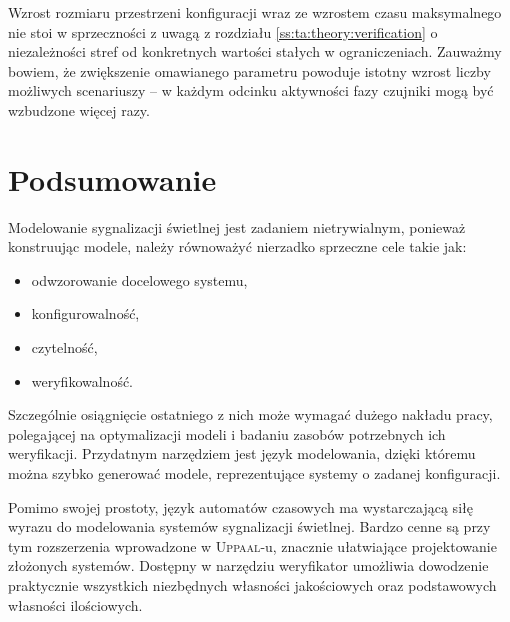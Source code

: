 \documentclass{pracamgr}
\newcommand{\upp}{\textsc{Uppaal}}
\theoremstyle{plain}
\begin{document}
Wzrost rozmiaru przestrzeni konfiguracji wraz ze wzrostem czasu
maksymalnego nie stoi w sprzeczności z uwagą z rozdziału
\ref{ss:ta:theory:verification} o niezależności stref od
konkretnych wartości stałych w ograniczeniach. Zauważmy bowiem, że
zwiększenie omawianego parametru powoduje istotny wzrost liczby
możliwych scenariuszy -- w każdym odcinku aktywności fazy czujniki
mogą być wzbudzone więcej razy.

\chapter*{Podsumowanie}
Modelowanie sygnalizacji świetlnej jest zadaniem nietrywialnym,
ponieważ konstruując modele, należy równoważyć nierzadko sprzeczne
cele takie jak:
\begin{itemize}
  \item odwzorowanie docelowego systemu,
  \item konfigurowalność,
  \item czytelność,
  \item weryfikowalność.
\end{itemize}
Szczególnie osiągnięcie ostatniego z nich może wymagać dużego nakładu
pracy, polegającej na optymalizacji modeli i badaniu zasobów
potrzebnych ich weryfikacji. Przydatnym narzędziem jest język
modelowania, dzięki któremu można szybko generować modele,
reprezentujące systemy o zadanej konfiguracji.

Pomimo swojej prostoty, język automatów czasowych ma wystarczającą
siłę wyrazu do modelowania systemów sygnalizacji świetlnej. Bardzo
cenne są przy tym rozszerzenia wprowadzone w \upp-u, znacznie
ułatwiające projektowanie złożonych systemów. Dostępny w narzędziu
weryfikator umożliwia dowodzenie praktycznie wszystkich niezbędnych
własności jakościowych oraz podstawowych własności ilościowych.




{}



\appendix
\end{document}
